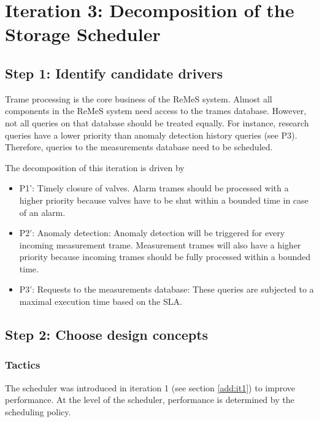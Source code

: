\section{Iteration 3: Decomposition of the Storage Scheduler}
\label{add:it3}

\subsection{Step 1: Identify candidate drivers}
\label{add:it3/drivers}

\npar Trame processing is the core business of the ReMeS system. Almost all
components in the ReMeS system need access to the trames database.
However, not all queries on that database should be treated equally. For
instance, research queries have a lower priority than anomaly detection history
queries (see P3). Therefore, queries to the measurements database need to be
scheduled.

\npar The decomposition of this iteration is driven by

\begin{itemize}
	\item P1': Timely closure of valves. Alarm trames should be processed with a
	higher priority because valves have to be shut within a bounded time in case of
	an alarm.
	\item P2': Anomaly detection: Anomaly detection will be triggered for every
	incoming measurement trame. Measurement trames will also have a higher
	priority because incoming trames should be fully processed within a bounded
	time.
	\item P3': Requests to the measurements database: These queries are subjected
	to a maximal execution time based on the SLA. 
\end{itemize}


\subsection{Step 2: Choose design concepts}
\label{add:it3/concepts}

\subsubsection{Tactics}
\label{add:it3/tactics}

\npar The scheduler was introduced in iteration 1 (see section \ref{add:it1}) to
improve performance. At the level of the scheduler, performance is determined by
the scheduling policy. 

